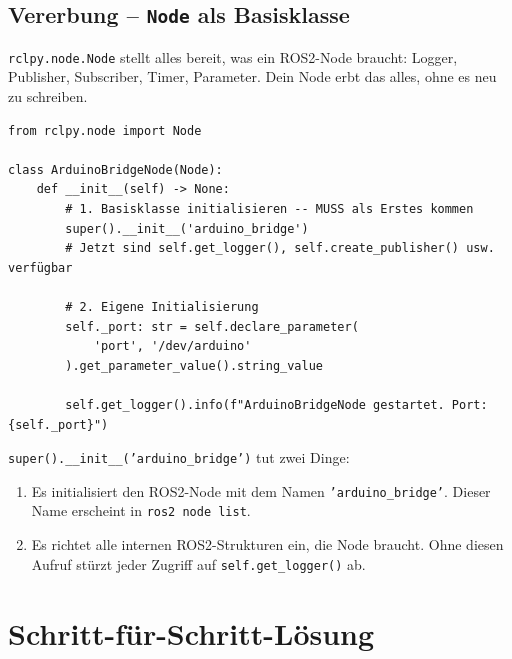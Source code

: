 \subsection{Vererbung -- \texttt{Node} als Basisklasse}

\texttt{rclpy.node.Node} stellt alles bereit, was ein ROS2-Node braucht:
Logger, Publisher, Subscriber, Timer, Parameter.
Dein Node erbt das alles, ohne es neu zu schreiben.

\begin{lstlisting}
from rclpy.node import Node

class ArduinoBridgeNode(Node):
    def __init__(self) -> None:
        # 1. Basisklasse initialisieren -- MUSS als Erstes kommen
        super().__init__('arduino_bridge')
        # Jetzt sind self.get_logger(), self.create_publisher() usw. verfügbar

        # 2. Eigene Initialisierung
        self._port: str = self.declare_parameter(
            'port', '/dev/arduino'
        ).get_parameter_value().string_value

        self.get_logger().info(f"ArduinoBridgeNode gestartet. Port: {self._port}")
\end{lstlisting}

\texttt{super().\_\_init\_\_('arduino\_bridge')} tut zwei Dinge:
\begin{enumerate}
\item Es initialisiert den ROS2-Node mit dem Namen \texttt{'arduino\_bridge'}.
  Dieser Name erscheint in \texttt{ros2 node list}.
\item Es richtet alle internen ROS2-Strukturen ein, die Node braucht.
  Ohne diesen Aufruf stürzt jeder Zugriff auf \texttt{self.get\_logger()} ab.
\end{enumerate}

\section{Schritt-für-Schritt-Lösung}

